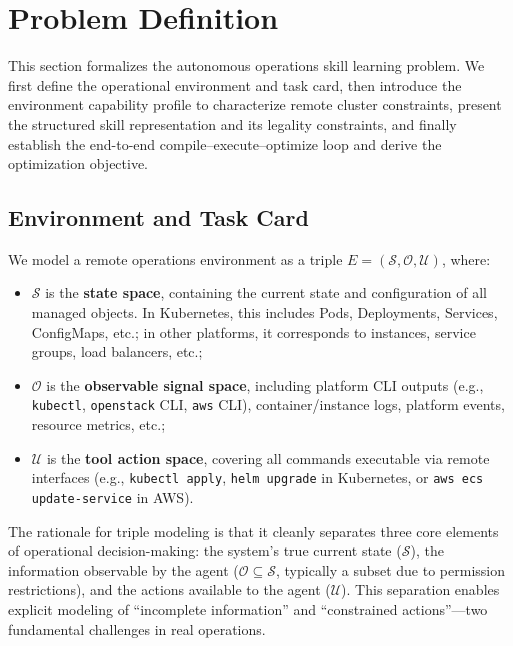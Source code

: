 \documentclass[conference,10pt]{IEEEtran}
\begin{document}
\section{Problem Definition}

This section formalizes the autonomous operations skill learning problem.
We first define the operational environment and task card, then introduce the environment capability profile to characterize remote cluster constraints, present the structured skill representation and its legality constraints, and finally establish the end-to-end compile--execute--optimize loop and derive the optimization objective.

\subsection{Environment and Task Card}

We model a remote operations environment as a triple $E=(\mathcal{S}, \mathcal{O}, \mathcal{U})$, where:
\begin{itemize}
  \item $\mathcal{S}$ is the \textbf{state space}, containing the current state and configuration of all managed objects. In Kubernetes, this includes Pods, Deployments, Services, ConfigMaps, etc.; in other platforms, it corresponds to instances, service groups, load balancers, etc.;
  \item $\mathcal{O}$ is the \textbf{observable signal space}, including platform CLI outputs (e.g., \texttt{kubectl}, \texttt{openstack} CLI, \texttt{aws} CLI), container/instance logs, platform events, resource metrics, etc.;
  \item $\mathcal{U}$ is the \textbf{tool action space}, covering all commands executable via remote interfaces (e.g., \texttt{kubectl apply}, \texttt{helm upgrade} in Kubernetes, or \texttt{aws ecs update-service} in AWS).
\end{itemize}
The rationale for triple modeling is that it cleanly separates three core elements of operational decision-making: the system's true current state ($\mathcal{S}$), the information observable by the agent ($\mathcal{O} \subseteq \mathcal{S}$, typically a subset due to permission restrictions), and the actions available to the agent ($\mathcal{U}$).
This separation enables explicit modeling of ``incomplete information'' and ``constrained actions''---two fundamental challenges in real operations.
\end{document}
